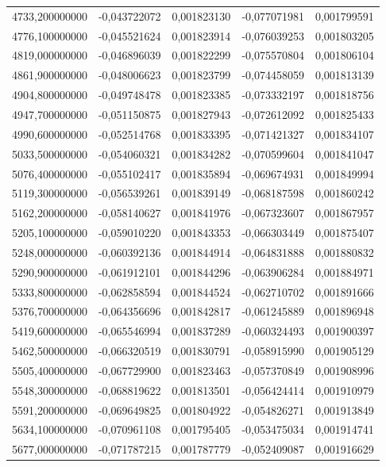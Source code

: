 \begin{longtable}{rrrrr}
4733,200000000 & -0,043722072 & 0,001823130 & -0,077071981 & 0,001799591\\
4776,100000000 & -0,045521624 & 0,001823914 & -0,076039253 & 0,001803205\\
4819,000000000 & -0,046896039 & 0,001822299 & -0,075570804 & 0,001806104\\
4861,900000000 & -0,048006623 & 0,001823799 & -0,074458059 & 0,001813139\\
4904,800000000 & -0,049748478 & 0,001823385 & -0,073332197 & 0,001818756\\
4947,700000000 & -0,051150875 & 0,001827943 & -0,072612092 & 0,001825433\\
4990,600000000 & -0,052514768 & 0,001833395 & -0,071421327 & 0,001834107\\
5033,500000000 & -0,054060321 & 0,001834282 & -0,070599604 & 0,001841047\\
5076,400000000 & -0,055102417 & 0,001835894 & -0,069674931 & 0,001849994\\
5119,300000000 & -0,056539261 & 0,001839149 & -0,068187598 & 0,001860242\\
5162,200000000 & -0,058140627 & 0,001841976 & -0,067323607 & 0,001867957\\
5205,100000000 & -0,059010220 & 0,001843353 & -0,066303449 & 0,001875407\\
5248,000000000 & -0,060392136 & 0,001844914 & -0,064831888 & 0,001880832\\
5290,900000000 & -0,061912101 & 0,001844296 & -0,063906284 & 0,001884971\\
5333,800000000 & -0,062858594 & 0,001844524 & -0,062710702 & 0,001891666\\
5376,700000000 & -0,064356696 & 0,001842817 & -0,061245889 & 0,001896948\\
5419,600000000 & -0,065546994 & 0,001837289 & -0,060324493 & 0,001900397\\
5462,500000000 & -0,066320519 & 0,001830791 & -0,058915990 & 0,001905129\\
5505,400000000 & -0,067729900 & 0,001823463 & -0,057370849 & 0,001908996\\
5548,300000000 & -0,068819622 & 0,001813501 & -0,056424414 & 0,001910979\\
5591,200000000 & -0,069649825 & 0,001804922 & -0,054826271 & 0,001913849\\
5634,100000000 & -0,070961108 & 0,001795405 & -0,053475034 & 0,001914741\\
5677,000000000 & -0,071787215 & 0,001787779 & -0,052409087 & 0,001916629\\

\end{longtable}
